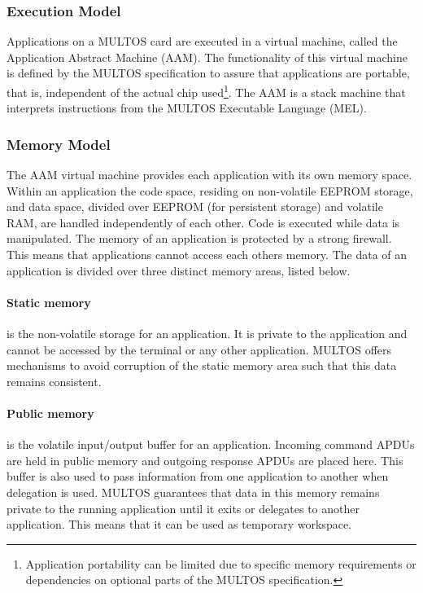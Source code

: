 \subsubsection{Execution Model}

Applications on a MULTOS card are executed in a virtual machine, called the
Application Abstract Machine (AAM). The functionality of this virtual machine
is defined by the MULTOS specification to assure that applications are
portable, that is, independent of the actual chip used\footnote{Application
portability can be limited due to specific memory requirements or dependencies
on optional parts of the MULTOS specification.}. The AAM is a stack machine
that interprets instructions from the MULTOS Executable Language (MEL).

\subsubsection{Memory Model}

The AAM virtual machine provides each application with its own memory space.
Within an application the code space, residing on non-volatile EEPROM storage,
and data space, divided over EEPROM (for persistent storage) and volatile RAM,
are handled independently of each other. Code is executed while data is
manipulated. The memory of an application is protected by a strong firewall.
This means that applications cannot access each others memory. The data of
an
application is divided over three distinct memory areas, listed below.

\paragraph{Static memory} is the non-volatile storage for an application. It is
private to the application and cannot be accessed by the terminal or any other
application. MULTOS offers mechanisms to avoid corruption of the static memory
area such that this data remains consistent.

\paragraph{Public memory} is the volatile input/output buffer for an
application. Incoming command APDUs are held in public memory and outgoing
response APDUs are placed here. This buffer is also used to pass information
from one application to another when delegation is used. MULTOS guarantees that
data in this memory remains private to the running application until it exits
or delegates to another application. This means that it can be used as
temporary workspace.

